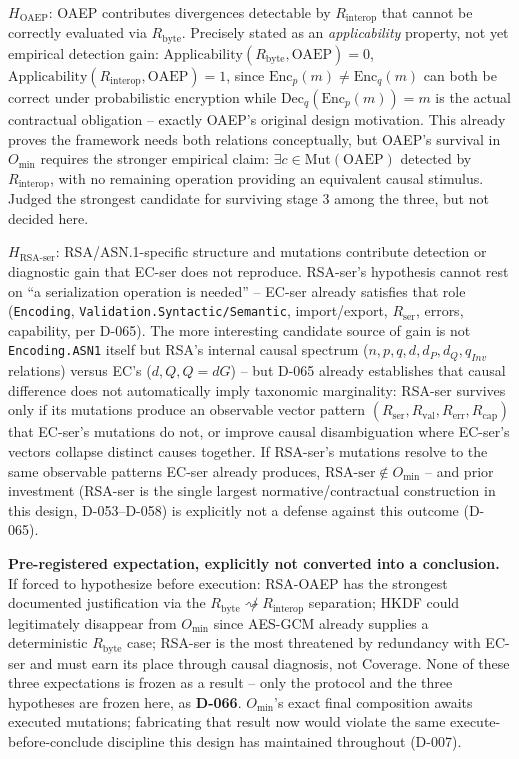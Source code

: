 \documentclass[11pt,a4paper]{article}
\begin{document}
$H_{\text{OAEP}}$: OAEP contributes divergences detectable by $R_{\text{interop}}$ that cannot be correctly evaluated via $R_{\text{byte}}$. Precisely stated as an \emph{applicability} property, not yet empirical detection gain: $\text{Applicability}(R_{\text{byte}}, \text{OAEP})=0$, $\text{Applicability}(R_{\text{interop}}, \text{OAEP})=1$, since $\text{Enc}_p(m)\neq\text{Enc}_q(m)$ can both be correct under probabilistic encryption while $\text{Dec}_q(\text{Enc}_p(m))=m$ is the actual contractual obligation -- exactly OAEP's original design motivation. This already proves the framework needs both relations conceptually, but OAEP's survival in $O_{\min}$ requires the stronger empirical claim: $\exists c\in\text{Mut}(\text{OAEP})$ detected by $R_{\text{interop}}$, with no remaining operation providing an equivalent causal stimulus. Judged the strongest candidate for surviving stage 3 among the three, but not decided here.

$H_{\text{RSA-ser}}$: RSA/ASN.1-specific structure and mutations contribute detection or diagnostic gain that EC-ser does not reproduce. RSA-ser's hypothesis cannot rest on ``a serialization operation is needed'' -- EC-ser already satisfies that role (\texttt{Encoding}, \texttt{Validation.Syntactic/Semantic}, import/export, $R_{\text{ser}}$, errors, capability, per D-065). The more interesting candidate source of gain is not \texttt{Encoding.ASN1} itself but RSA's internal causal spectrum ($n,p,q,d,d_P,d_Q,q_{Inv}$ relations) versus EC's ($d,Q,Q=dG$) -- but D-065 already establishes that causal difference does not automatically imply taxonomic marginality: RSA-ser survives only if its mutations produce an observable vector pattern $(R_{\text{ser}}, R_{\text{val}}, R_{\text{err}}, R_{\text{cap}})$ that EC-ser's mutations do not, or improve causal disambiguation where EC-ser's vectors collapse distinct causes together. If RSA-ser's mutations resolve to the same observable patterns EC-ser already produces, $\text{RSA-ser}\notin O_{\min}$ -- and prior investment (RSA-ser is the single largest normative/contractual construction in this design, D-053--D-058) is explicitly not a defense against this outcome (D-065).

\textbf{Pre-registered expectation, explicitly not converted into a conclusion.} If forced to hypothesize before execution: RSA-OAEP has the strongest documented justification via the $R_{\text{byte}}\not\rightsquigarrow R_{\text{interop}}$ separation; HKDF could legitimately disappear from $O_{\min}$ since AES-GCM already supplies a deterministic $R_{\text{byte}}$ case; RSA-ser is the most threatened by redundancy with EC-ser and must earn its place through causal diagnosis, not Coverage. None of these three expectations is frozen as a result -- only the protocol and the three hypotheses are frozen here, as \textbf{D-066}. $O_{\min}$'s exact final composition awaits executed mutations; fabricating that result now would violate the same execute-before-conclude discipline this design has maintained throughout (D-007).
\end{document}
